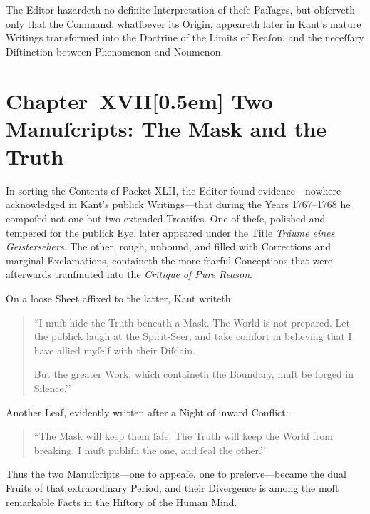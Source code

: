 \documentclass[12pt]{book}
\begin{document}
The Editor hazardeth no definite Interpretation of theſe Paſſages, but obſerveth only that the Command, whatſoever its Origin, appeareth later in Kant’s mature Writings transformed into the Doctrine of the Limits of Reaſon, and the neceſſary Diſtinction between Phenomenon and Noumenon.


\chapter*{Chapter~XVII[0.5em]
Two Manuſcripts: The Mask and the Truth}


In sorting the Contents of Packet XLII, the Editor found evidence—nowhere acknowledged in Kant's publick Writings—that during the Years 1767–1768 he compoſed not one but two extended Treatiſes. One of theſe, polished and tempered for the publick Eye, later appeared under the Title \textit{Träume eines Geistersehers}. The other, rough, unbound, and filled with Corrections and marginal Exclama­tions, containeth the more fearful Conceptions that were afterwards tranſmuted into the \textit{Critique of Pure Reason}.

On a loose Sheet affixed to the latter, Kant writeth:

\begin{quote}
``I muſt hide the Truth beneath a Mask. The World is not prepared. Let the publick laugh at the Spirit-Seer, and take comfort in believing that I have allied myſelf with their Diſdain.

But the greater Work, which containeth the Boundary, muſt be forged in Silence.’’
\end{quote}

Another Leaf, evidently written after a Night of inward Conflict:

\begin{quote}
``The Mask will keep them ſafe. The Truth will keep the World from breaking. I muſt publiſh the one, and ſeal the other.’’
\end{quote}

Thus the two Manuſcripts—one to appeaſe, one to preſerve—became the dual Fruits of that extraordinary Period, and their Divergence is among the moſt remarkable Facts in the Hiſtory of the Human Mind.
\end{document}

